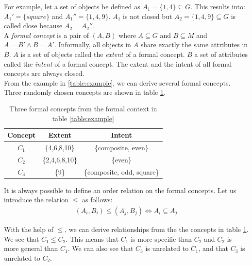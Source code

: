 \documentclass[11pt]{report}
\begin{document}
{{For example, let a set of objects be defined as $A_1 = \{1,4\} \subseteq G$. This results into: $A_1' = \{square\}$ and $A_1'' = \{1,4,9\}$. $A_1$ is not closed but $A_2 = \{1,4,9\} \subseteq G$ is called close because $A_2 = A_2''$. \\   

A \textit{formal concept} is a pair of $(A, B)$ where $A \subseteq G$ and $B \subseteq M$ and $A = B' \wedge B = A' $. Informally, all objects in $A$ share exactly the same attributes in $B$. $A$ is a set of objects called the \textit{extent} of a formal concept. $B$ a set of attributes called the \textit{intent} of a formal concept. The extent and the intent of all formal concepts are always closed.\\

From the example in \ref{table:example}, we can derive several formal concepts. Three randomly chosen concepts are shown in table \ref{table:exampleConcepts}. \\

\begin{table}[h]
\caption{Three formal concepts from the formal context in table \ref{table:example}}
\label{table:exampleConcepts}
\centering

\def\arraystretch{1.2}%
\begin{tabular}{ c c c }
\hline
 Concept & Extent & Intent \\
\hline

$C_1$ & \{4,6,8,10\} & \{composite, even\} \\
$C_2$ & \{2,4,6,8,10\} & \{even\} \\
$C_3$ & \{9\} & \{composite, odd, square\} \\

\hline
\end{tabular}
\end{table}

It is always possible to define an order relation on the formal concepts. Let us introduce the relation $\le$ as follows:
\begin{align*} (A_i,B_i) \le (A_j, B_j) \Longleftrightarrow	A_i \subseteq A_j
\end{align*}

With the help of $\le$, we  can derive relationships from the the concepts in table \ref{table:exampleConcepts}. We see that $C_1 \le C_2$. This means that $C_1$ is more specific than $C_2$ and $C_2$ is more general than $C_1$. We can also see that $C_3$ is unrelated to $C_1$, and that $C_3$ is unrelated to $C_2$. \\

}}
\end{document}
